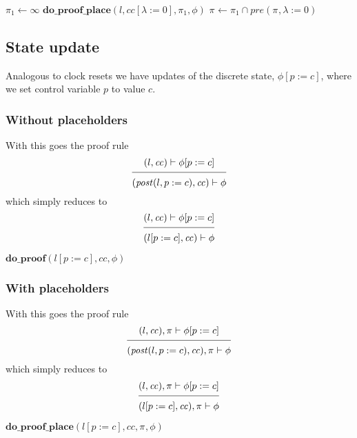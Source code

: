 \documentclass{article}
\newcommand{\proofrule}[3][]{#1 \frac{\raisebox{.7ex}{\normalsize{$#2$}}}
  {\raisebox{-1.0ex}{\normalsize{$#3$}}}}
\newcommand{\placeholder}[1][]{\pi_{#1}}
\newcommand{\loc}{l}
\newcommand{\region}{\mathit{cc}}
\newcommand{\post}{\mathit{post}}
\newcommand{\method}[1]{\ensuremath{\mathbf{#1}}}
\begin{document}
\begin{algorithm}[H]
  \caption{$\method{do\_proof\_place\_reset}(\loc, \region, \placeholder, \phi[\lambda := 0]$}
  \begin{algorithmic}
    \STATE $\placeholder[1] \gets \infty$
    \STATE $\method{do\_proof\_place}(\loc, \region[\lambda := 0], \placeholder[1], \phi)$
    \STATE $\placeholder \gets \placeholder[1] \cap \mathit{pre}(\placeholder, \lambda := 0)$
  \end{algorithmic}
  \end{algorithm}

\subsection{State update}
Analogous to clock resets we have updates of the discrete state, $\phi[p := c]$, where we set control variable $p$ to value $c$.

\subsubsection{Without placeholders}
With this goes the proof rule
\[
\proofrule
{(\loc, \region) \vdash \phi[p := c]}
{(\post(\loc, p := c), \region) \vdash \phi}
\]
which simply reduces to
\[
\proofrule
{(\loc, \region) \vdash \phi[p := c]}
{(\loc[p := c], \region) \vdash \phi}
\]

\begin{algorithm}[H]
  \caption{$\method{do\_proof\_sublist}(\loc, \region, \phi[p := c]$}
  \begin{algorithmic}
  \RETURN $\method{do\_proof}(\loc[p := c], \region, \phi)$
  \end{algorithmic}
  \end{algorithm}

\subsubsection{With placeholders}
With this goes the proof rule
\[
\proofrule
{(\loc, \region), \placeholder \vdash \phi[p := c]}
{(\post(\loc, p := c), \region), \placeholder \vdash \phi}
\]
which simply reduces to
\[
\proofrule
{(\loc, \region), \placeholder \vdash \phi[p := c]}
{(\loc[p := c], \region), \placeholder \vdash \phi}
\]

\begin{algorithm}[H]
  \caption{$\method{do\_proof\_place\_sublist}(\loc, \region, \placeholder, \phi[p := c]$}
  \begin{algorithmic}
  \STATE $\method{do\_proof\_place}(\loc[p := c], \region, \placeholder, \phi)$
  \end{algorithmic}
  \end{algorithm}
\end{document}
